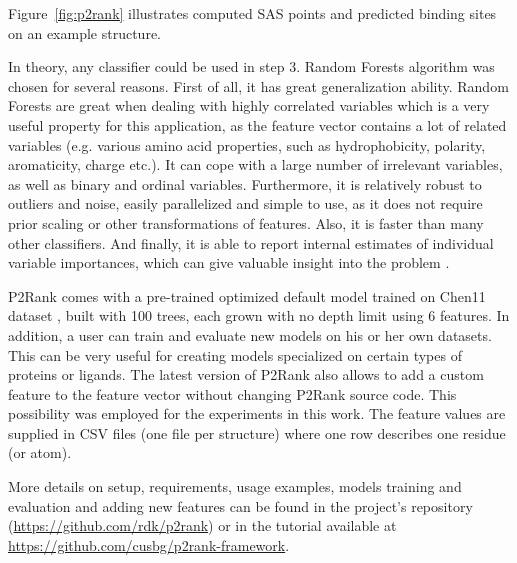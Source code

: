 Figure~\ref{fig:p2rank} illustrates computed SAS points and predicted binding sites on an example structure.

In theory, any classifier could be used in step 3. Random Forests algorithm was chosen for several reasons. First of all, it has great generalization ability. Random Forests are great when dealing with highly correlated variables \cite{forests_biology} which is a very useful property for this application, as the feature vector contains a lot of related variables (e.g. various amino acid properties, such as hydrophobicity, polarity, aromaticity, charge etc.). It can cope with a large number of irrelevant variables, as well as binary and ordinal variables. Furthermore, it is relatively robust to outliers and noise, easily parallelized and simple to use, as it does not require prior scaling or other transformations of features. Also, it is faster than many other classifiers. And finally, it is able to report internal estimates of individual variable importances, which can give valuable insight into the problem \cite{randomforests, forests_biology, p2rank2}.

P2Rank comes with a pre-trained optimized default model trained on Chen11 dataset \cite{benchmark}, built with 100 trees, each grown with no depth limit using 6 features. In addition, a user can train and evaluate new models on his or her own datasets. This can be very useful for creating models specialized on certain types of proteins or ligands. The latest version of P2Rank also allows to add a custom feature to the feature vector without changing P2Rank source code. This possibility was employed for the experiments in this work. The feature values are supplied in CSV files (one file per structure) where one row describes one residue (or atom).

More details on setup, requirements, usage examples, models training and evaluation and adding new features can be found in the project's repository (\url{https://github.com/rdk/p2rank}) or in the tutorial available at \url{https://github.com/cusbg/p2rank-framework}.


